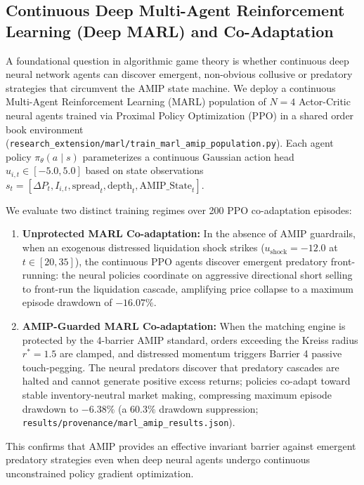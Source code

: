 \documentclass[10pt,twocolumn,letterpaper]{article}
\theoremstyle{definition}
\theoremstyle{remark}
\begin{document}
\subsection{Continuous Deep Multi-Agent Reinforcement Learning (Deep MARL) and Co-Adaptation}
\label{sec:deep_marl_coadaptation}
A foundational question in algorithmic game theory is whether continuous deep neural network agents can discover emergent, non-obvious collusive or predatory strategies that circumvent the AMIP state machine.
We deploy a continuous Multi-Agent Reinforcement Learning (MARL) population of $N = 4$ Actor-Critic neural agents trained via Proximal Policy Optimization (PPO) in a shared order book environment (\texttt{research\_extension/marl/train\_marl\_amip\_population.py}). Each agent policy $\pi_\theta(a \mid s)$ parameterizes a continuous Gaussian action head $u_{i,t} \in [-5.0, 5.0]$ based on state observations $s_t = [\Delta P_t, I_{i,t}, \text{spread}_t, \text{depth}_t, \text{AMIP\_State}_t]$.

We evaluate two distinct training regimes over 200 PPO co-adaptation episodes:
\begin{enumerate}
    \item \textbf{Unprotected MARL Co-adaptation:} In the absence of AMIP guardrails, when an exogenous distressed liquidation shock strikes ($u_{\text{shock}} = -12.0$ at $t \in [20, 35]$), the continuous PPO agents discover emergent predatory front-running: the neural policies coordinate on aggressive directional short selling to front-run the liquidation cascade, amplifying price collapse to a maximum episode drawdown of \textbf{$-16.07\%$}.
    \item \textbf{AMIP-Guarded MARL Co-adaptation:} When the matching engine is protected by the 4-barrier AMIP standard, orders exceeding the Kreiss radius $r^* = 1.5$ are clamped, and distressed momentum triggers Barrier 4 passive touch-pegging. The neural predators discover that predatory cascades are halted and cannot generate positive excess returns; policies co-adapt toward stable inventory-neutral market making, compressing maximum episode drawdown to \textbf{$-6.38\%$} (a \textbf{$60.3\%$} drawdown suppression; \texttt{results/provenance/marl\_amip\_results.json}).
\end{enumerate}
This confirms that AMIP provides an effective invariant barrier against emergent predatory strategies even when deep neural agents undergo continuous unconstrained policy gradient optimization.
\end{document}
